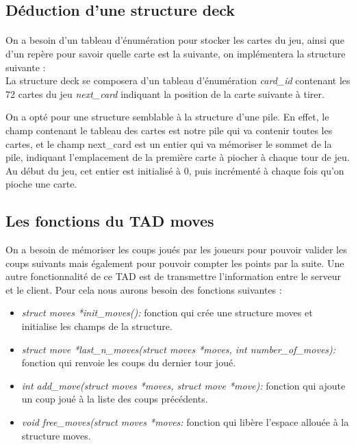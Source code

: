 \documentclass[12pt]{article}
\begin{document}
\subsection{Déduction d'une structure deck}

\paragraph{} On a besoin d'un tableau d'énumération pour stocker les cartes du jeu, ainsi que d'un repère pour savoir quelle carte est la suivante, on implémentera la structure suivante :\\ 

La structure deck se composera d'un tableau d'énumération \textit{card\_id} contenant les 72 cartes du jeu \textit{next\_card} indiquant la position de la carte suivante à tirer.

On a opté pour une structure semblable à la structure d'une pile. En effet, le champ contenant le tableau des cartes est notre pile qui va contenir toutes les cartes, et le champ next\_card est un entier qui va mémoriser le sommet de la pile, indiquant l'emplacement de la première carte à piocher à chaque tour de jeu. Au début du jeu, cet entier est initialisé à 0, puis incrémenté à chaque fois qu'on pioche une carte. \\

\subsection{Les fonctions du TAD moves}

On a besoin de mémoriser les coups joués par les joueurs pour pouvoir valider les coups suivants mais également pour pouvoir compter les points par la suite. Une autre fonctionnalité de ce TAD est de transmettre l'information entre le serveur et le client. Pour cela nous aurons besoin des fonctions suivantes :

\begin{itemize}
\item \textit{struct moves *init\_moves():} fonction qui crée une structure moves et initialise les champs de la structure.\\
\item \textit{struct move *last\_n\_moves(struct moves *moves, int number\_of\_moves):} fonction qui renvoie les coups du dernier tour joué.\\
\item \textit{int add\_move(struct moves *moves, struct move *move):} fonction qui ajoute un coup joué à la liste des coups précédents.\\
\item \textit{void free\_moves(struct moves *moves:} fonction qui libère l'espace allouée à la structure moves.\\
\end{itemize}
\end{document}
